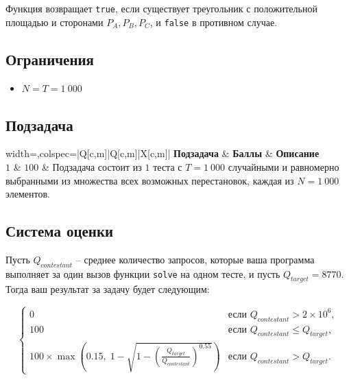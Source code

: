 \documentclass[12pt]{article}
\begin{document}
Функция возвращает \texttt{true}, если существует треугольник с положительной площадью и сторонами $P_A,P_B,P_C$, и \texttt{false} в противном случае.

\subsection{Ограничения}
\vspace{0.1em}
\begin{itemize}
	\item $N = T = 1~000$
\end{itemize}

\newpage

\subsection{Подзадача}
\begin{table}[H]
	\begin{tblr}{width=\linewidth,colspec={|Q[c,m]|Q[c,m]|X[c,m]|}}
		\hline
		\textbf{Подзадача} & \textbf{Баллы} & \textbf{Описание}\\
		\hline
		$1$ & $100$ & Подзадача состоит из $1$ теста с $T=1~000$ случайными и равномерно выбранными из множества всех возможных перестановок, каждая из $N=1~000$ элементов. \\
		\hline
	\end{tblr}
	\caption*{Баллы за подзадачу начисляются только в том случае, если выполнены все необходимые для нее тесты.}
\end{table}
\FloatBarrier

\subsection{Система оценки}

Пусть $Q_{contestant}$ -- среднее количество запросов, которые ваша программа выполняет за один вызов функции \texttt{solve} на одном тесте, и пусть $Q_{target}=8770$. Тогда ваш результат за задачу будет следующим:

\[
\begin{cases}
0 & \text{если } Q_{contestant} > 2\times 10^6, \\
100 & \text{если } Q_{contestant} \le Q_{target}, \\
100 \times \max\left(0.15,\; 1-\sqrt{1-\left(\frac{Q_{target}}{Q_{contestant}}\right)^{0.55}}\right) & \text{если  } Q_{contestant} > Q_{target}.
\end{cases}
\]
\end{document}
